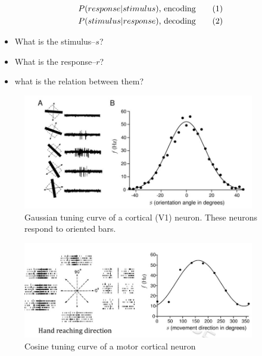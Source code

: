 \documentclass[]{article}
\newcommand\numberthis{\addtocounter{equation}{1}\tag{\theequation}}
\begin{document}
\begin{align*}
	P(response\vert stimulus)&\text{, encoding} \numberthis \label{eq:p_r_s}\\
	P(stimulus\vert response)&\text{, decoding}  \numberthis \label{eq:p_s_r}
\end{align*}

\begin{itemize}
	\item What is the stimulus--$s$?
	\item What is the response--$r$?
	\item what is the relation between them?
\end{itemize}
\begin{figure}[H]
	\begin{center}
		\caption[Gaussian tuning curve of a cortical (V1) neuron]{Gaussian tuning curve of a cortical (V1) neuron. These neurons respond to oriented bars.}
		\includegraphics[width=0.9\textwidth]{tuning-curves}
	\end{center}
\end{figure}

\begin{figure}[H]
	\begin{center}
		\caption{Cosine tuning curve of a motor cortical neuron}
		\includegraphics[width=0.9\textwidth]{tuning-curves1}
	\end{center}
\end{figure}
\end{document}
